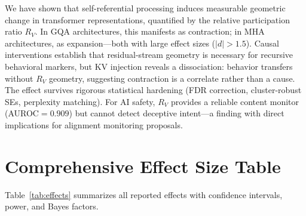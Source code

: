 \documentclass{article}
\newcommand{\RV}{R_V}
\newcommand{\dcohen}{d}
\begin{document}
We have shown that self-referential processing induces measurable geometric change in transformer representations, quantified by the relative participation ratio $\RV$.
In GQA architectures, this manifests as contraction; in MHA architectures, as expansion---both with large effect sizes ($|\dcohen| > 1.5$).
Causal interventions establish that residual-stream geometry is necessary for recursive behavioral markers, but KV injection reveals a dissociation: behavior transfers without $\RV$ geometry, suggesting contraction is a correlate rather than a cause.
The effect survives rigorous statistical hardening (FDR correction, cluster-robust SEs, perplexity matching).
For AI safety, $\RV$ provides a reliable content monitor (AUROC${=}0.909$) but cannot detect deceptive intent---a finding with direct implications for alignment monitoring proposals.






\appendix

\section{Comprehensive Effect Size Table}
\label{app:effects}

Table~\ref{tab:effects} summarizes all reported effects with confidence intervals, power, and Bayes factors.
\end{document}
